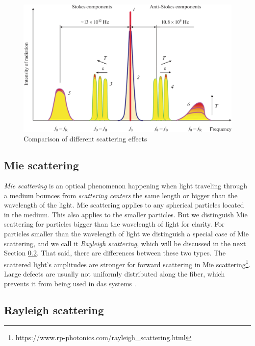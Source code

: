\begin{figure}
    \centering
    \includegraphics[width=\linewidth]{obrazky/scatterings.png}
    \caption{Comparison of different scattering effects \cite{scattering.comparison}}
    \label{fig:scattering.comparison}
\end{figure}

\subsection{Mie scattering}\label{txt.scattering.mie}

\textit{Mie scattering} is an optical phenomenon happening when light traveling through a medium bounces from \textit{scattering centers} the same length or bigger than the wavelength of the light. Mie scattering applies to any spherical particles located in the medium. This also applies to the smaller particles. But we distinguish Mie scattering for particles bigger than the wavelength of light for clarity. For particles smaller than the wavelength of light we distinguish a special case of Mie scattering, and we call it \textit{Rayleigh scattering}, which will be discussed in the next Section \ref{txt.scattering.ray}. That said, there are differences between these two types. The scattered light's amplitudes are stronger for forward scattering in Mie scattering\footnote{https://www.rp-photonics.com/rayleigh\_scattering.html}. Large defects are usually not uniformly distributed along the fiber, which prevents it from being used in \ac{das} systems \cite{dasKislov}.

\subsection{Rayleigh scattering}\label{txt.scattering.ray}

